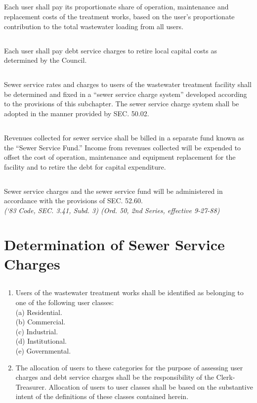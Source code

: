 \subsection{}
Each user shall pay its proportionate share of operation, maintenance and replacement costs of the treatment works, based on the user’s proportionate contribution to the total wastewater loading from all users.
\subsection{}
Each user shall pay debt service charges to retire local capital costs as determined by the Council.
\subsection{}
Sewer service rates and charges to users of the wastewater treatment facility shall be determined and fixed in a “sewer service charge system” developed according to the provisions of this subchapter. The sewer service charge system shall be adopted in the manner provided by SEC. 50.02.
\subsection{}
Revenues collected for sewer service shall be billed in a separate fund known as the “Sewer Service Fund.” Income from revenues collected will be expended to offset the cost of operation, maintenance and equipment replacement for the facility and to retire the debt for capital expenditure.
\subsection{}
Sewer service charges and the sewer service fund will be administered in accordance with the provisions of SEC. 52.60.\\
\emph{(‘83 Code, SEC. 3.41, Subd. 3) (Ord. 50, 2nd Series, effective 9-27-88)}
\section{Determination of Sewer Service Charges}
\subsection{}
\begin{enumerate}
\item Users of the wastewater treatment works shall be identified as belonging to one of the following user classes:
\\\indent(a) Residential.
\\\indent(b) Commercial.
\\\indent(c) Industrial.
\\\indent(d) Institutional.
\\\indent(e) Governmental.
\item The allocation of users to these categories for the purpose of assessing user charges and debt service charges shall be the responsibility of the Clerk-Treasurer.  Allocation of users to user classes shall be based on the substantive intent of the definitions of these classes contained herein.
\end{enumerate}
